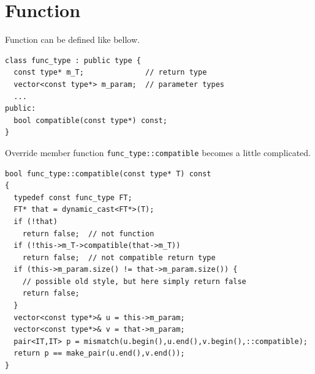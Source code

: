 \section{Function}

Function can be defined like bellow.
\begin{verbatim}
class func_type : public type {
  const type* m_T;              // return type
  vector<const type*> m_param;  // parameter types
  ...
public:
  bool compatible(const type*) const;
}
\end{verbatim}

Override member function {\tt{func\_type::compatible}}
becomes a little complicated.

\begin{verbatim}
bool func_type::compatible(const type* T) const
{
  typedef const func_type FT;
  FT* that = dynamic_cast<FT*>(T);
  if (!that)
    return false;  // not function
  if (!this->m_T->compatible(that->m_T))
    return false;  // not compatible return type
  if (this->m_param.size() != that->m_param.size()) {
    // possible old style, but here simply return false
    return false;
  }
  vector<const type*>& u = this->m_param;
  vector<const type*>& v = that->m_param;
  pair<IT,IT> p = mismatch(u.begin(),u.end(),v.begin(),::compatible);
  return p == make_pair(u.end(),v.end());
}
\end{verbatim}

